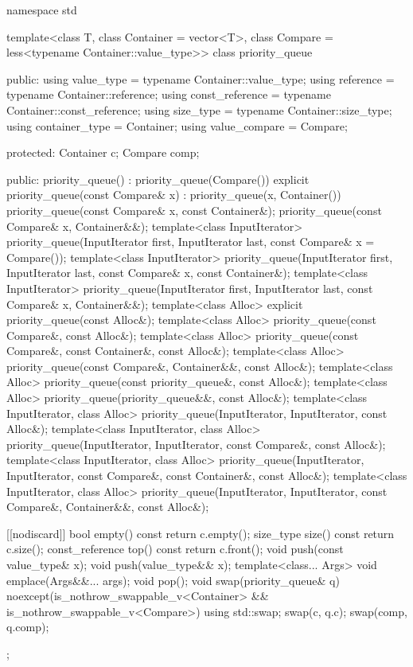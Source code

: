 \begin{codeblock}
namespace std {
  template<class T, class Container = vector<T>,
           class Compare = less<typename Container::value_type>>
  class priority_queue {
  public:
    using value_type      = typename Container::value_type;
    using reference       = typename Container::reference;
    using const_reference = typename Container::const_reference;
    using size_type       = typename Container::size_type;
    using container_type  = Container;
    using value_compare   = Compare;

  protected:
    Container c;
    Compare comp;

  public:
    priority_queue() : priority_queue(Compare()) {}
    explicit priority_queue(const Compare& x) : priority_queue(x, Container()) {}
    priority_queue(const Compare& x, const Container&);
    priority_queue(const Compare& x, Container&&);
    template<class InputIterator>
      priority_queue(InputIterator first, InputIterator last, const Compare& x = Compare());
    template<class InputIterator>
      priority_queue(InputIterator first, InputIterator last, const Compare& x,
                     const Container&);
    template<class InputIterator>
      priority_queue(InputIterator first, InputIterator last, const Compare& x,
                     Container&&);
    template<class Alloc> explicit priority_queue(const Alloc&);
    template<class Alloc> priority_queue(const Compare&, const Alloc&);
    template<class Alloc> priority_queue(const Compare&, const Container&, const Alloc&);
    template<class Alloc> priority_queue(const Compare&, Container&&, const Alloc&);
    template<class Alloc> priority_queue(const priority_queue&, const Alloc&);
    template<class Alloc> priority_queue(priority_queue&&, const Alloc&);
    template<class InputIterator, class Alloc>
      priority_queue(InputIterator, InputIterator, const Alloc&);
    template<class InputIterator, class Alloc>
      priority_queue(InputIterator, InputIterator, const Compare&, const Alloc&);
    template<class InputIterator, class Alloc>
      priority_queue(InputIterator, InputIterator, const Compare&, const Container&,
                     const Alloc&);
    template<class InputIterator, class Alloc>
      priority_queue(InputIterator, InputIterator, const Compare&, Container&&, const Alloc&);

    [[nodiscard]] bool empty() const { return c.empty(); }
    size_type size()  const          { return c.size(); }
    const_reference   top() const    { return c.front(); }
    void push(const value_type& x);
    void push(value_type&& x);
    template<class... Args> void emplace(Args&&... args);
    void pop();
    void swap(priority_queue& q) noexcept(is_nothrow_swappable_v<Container> &&
                                          is_nothrow_swappable_v<Compare>)
      { using std::swap; swap(c, q.c); swap(comp, q.comp); }
  };

}
\end{codeblock}
